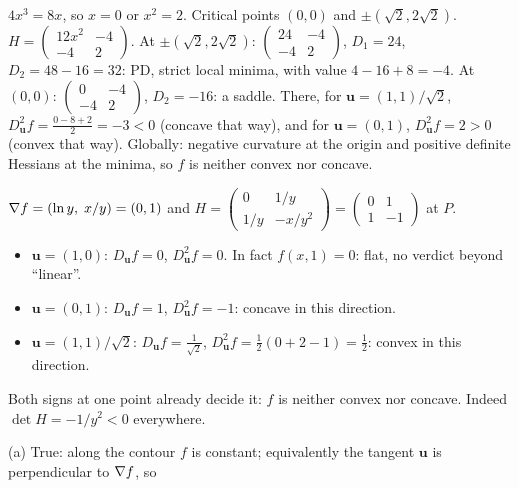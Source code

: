 \begin{solutions}
        $4x^{3}=8x$, so $x=0$ or $x^{2}=2$. Critical points $(0,0)$ and
        $\pm(\sqrt2,2\sqrt2)$. $H=\begin{pmatrix}12x^{2}&-4\\-4&2\end{pmatrix}$.
        At $\pm(\sqrt2,2\sqrt2)$: $\begin{pmatrix}24&-4\\-4&2\end{pmatrix}$,
        $D_{1}=24$, $D_{2}=48-16=32$: PD, strict local minima, with value
        $4-16+8=-4$. At $(0,0)$: $\begin{pmatrix}0&-4\\-4&2\end{pmatrix}$,
        $D_{2}=-16$: a saddle. There, for $\mathbf{u}=(1,1)/\sqrt2$,
        $D^{2}_{\mathbf{u}}f=\tfrac{0-8+2}{2}=-3<0$ (concave that way), and
        for $\mathbf{u}=(0,1)$, $D^{2}_{\mathbf{u}}f=2>0$ (convex that way).
        Globally: negative curvature at the origin and positive definite
        Hessians at the minima, so $f$ is neither convex nor concave.
  \item $\nabla f=(\ln y,\;x/y)=(0,1)$ and
        $H=\begin{pmatrix}0&1/y\\1/y&-x/y^{2}\end{pmatrix}=
        \begin{pmatrix}0&1\\1&-1\end{pmatrix}$ at $P$.
        \begin{itemize}[leftmargin=1.2em,itemsep=0.2ex]
          \item $\mathbf{u}=(1,0)$: $D_{\mathbf{u}}f=0$,
                $D^{2}_{\mathbf{u}}f=0$. In fact $f(x,1)=0$: flat, no
                verdict beyond ``linear''.
          \item $\mathbf{u}=(0,1)$: $D_{\mathbf{u}}f=1$,
                $D^{2}_{\mathbf{u}}f=-1$: concave in this direction.
          \item $\mathbf{u}=(1,1)/\sqrt2$: $D_{\mathbf{u}}f=\tfrac{1}{\sqrt2}$,
                $D^{2}_{\mathbf{u}}f=\tfrac12(0+2-1)=\tfrac12$: convex in
                this direction.
        \end{itemize}
        Both signs at one point already decide it: $f$ is neither convex
        nor concave. Indeed $\det H=-1/y^{2}<0$ everywhere.
  \item (a) True: along the contour $f$ is constant; equivalently the
        tangent $\mathbf{u}$ is perpendicular to $\nabla f$, so

\end{solutions}
